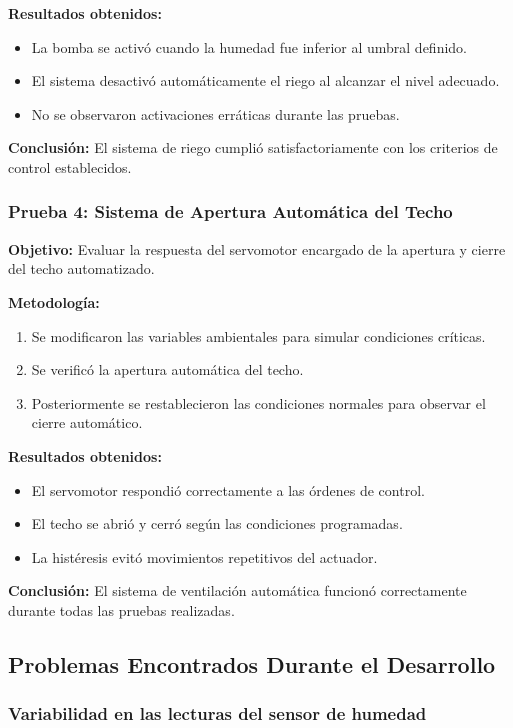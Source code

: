 \documentclass[conference]{IEEEtran}
\begin{document}
\textbf{Resultados obtenidos:}
\begin{itemize}
    \item La bomba se activó cuando la humedad fue inferior al umbral definido.
    \item El sistema desactivó automáticamente el riego al alcanzar el nivel adecuado.
    \item No se observaron activaciones erráticas durante las pruebas.
\end{itemize}

\textbf{Conclusión:}
El sistema de riego cumplió satisfactoriamente con los criterios de control establecidos.

\subsubsection{Prueba 4: Sistema de Apertura Automática del Techo}

\textbf{Objetivo:}
Evaluar la respuesta del servomotor encargado de la apertura y cierre del techo automatizado.

\textbf{Metodología:}
\begin{enumerate}
    \item Se modificaron las variables ambientales para simular condiciones críticas.
    \item Se verificó la apertura automática del techo.
    \item Posteriormente se restablecieron las condiciones normales para observar el cierre automático.
\end{enumerate}

\textbf{Resultados obtenidos:}
\begin{itemize}
    \item El servomotor respondió correctamente a las órdenes de control.
    \item El techo se abrió y cerró según las condiciones programadas.
    \item La histéresis evitó movimientos repetitivos del actuador.
\end{itemize}

\textbf{Conclusión:}
El sistema de ventilación automática funcionó correctamente durante todas las pruebas realizadas.

\subsection{Problemas Encontrados Durante el Desarrollo}

\subsubsection{Variabilidad en las lecturas del sensor de humedad}
\end{document}
